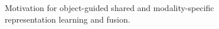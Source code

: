 \begin{figure}[p]
\centering
{}
\caption{Motivation for object-guided shared and modality-specific representation learning and fusion.}
\label{fig:1}
\end{figure}
